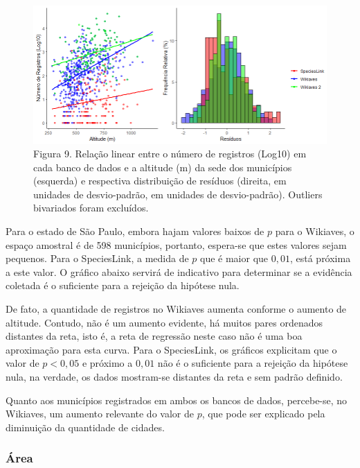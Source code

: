 \begin{figure}[h!]
\centering
\includegraphics[width = 15cm]{Imagens/G01.png}
\\{\scriptsize Figura 9. Relação linear entre o número de registros (Log10) em cada banco de dados e a altitude (m) da sede dos municípios (esquerda) e respectiva distribuição de resíduos (direita, em unidades de desvio-padrão, em unidades de desvio-padrão). Outliers bivariados foram excluídos. }
\end{figure}
\newpage

\begin{resposta}
Para o estado de São Paulo, embora hajam valores baixos de $p$ para o Wikiaves, o espaço amostral é de 598 municípios, portanto, espera-se que estes valores sejam pequenos. Para o SpeciesLink, a medida de $p$ que é maior que $0,01$, está próxima a este valor. O gráfico abaixo servirá de indicativo para determinar se a evidência coletada é o suficiente para a rejeição da hipótese nula.

De fato, a quantidade de registros no Wikiaves aumenta conforme o aumento de altitude. Contudo, não é um aumento evidente, há muitos pares ordenados distantes da reta, isto é, a reta de regressão neste caso não é uma boa aproximação para esta curva. Para o SpeciesLink, os gráficos explicitam que o valor de $p < 0,05$ e próximo a $0,01$ não é o suficiente para a rejeição da hipótese nula, na verdade, os dados mostram-se distantes da reta e sem padrão definido.

Quanto aos municípios registrados em ambos os bancos de dados, percebe-se, no Wikiaves, um aumento relevante do valor de $p$, que pode ser explicado pela diminuição da quantidade de cidades. 
\end{resposta}



\subsubsection{Área}


